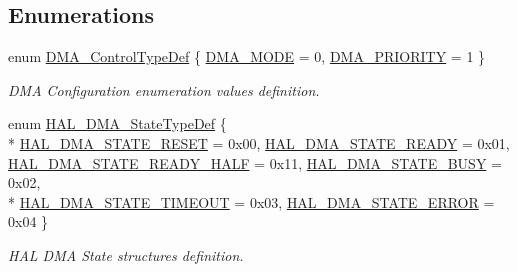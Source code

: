 \subsection*{Enumerations}
\begin{DoxyCompactItemize}
\item 
enum \hyperlink{group___d_m_a___exported___types_ga0d2b4c627fbe74a3100d0959afeae2f1}{D\-M\-A\-\_\-\-Control\-Type\-Def} \{ \hyperlink{group___d_m_a___exported___types_gga0d2b4c627fbe74a3100d0959afeae2f1a1eca8643c497fdd3e425429e7c6cfa42}{D\-M\-A\-\_\-\-M\-O\-D\-E} = 0, 
\hyperlink{group___d_m_a___exported___types_gga0d2b4c627fbe74a3100d0959afeae2f1aeedf19ee552db82049c94b70c8d59fb2}{D\-M\-A\-\_\-\-P\-R\-I\-O\-R\-I\-T\-Y} = 1
 \}
\begin{DoxyCompactList}\small\item\em D\-M\-A Configuration enumeration values definition. \end{DoxyCompactList}\item 
enum \hyperlink{group___d_m_a___exported___types_ga9c012af359987a240826f29073bbe463}{H\-A\-L\-\_\-\-D\-M\-A\-\_\-\-State\-Type\-Def} \{ \\*
\hyperlink{group___d_m_a___exported___types_gga9c012af359987a240826f29073bbe463a9e7be73da32b8c837cde0318e0d5eed2}{H\-A\-L\-\_\-\-D\-M\-A\-\_\-\-S\-T\-A\-T\-E\-\_\-\-R\-E\-S\-E\-T} = 0x00, 
\hyperlink{group___d_m_a___exported___types_gga9c012af359987a240826f29073bbe463ad497944e6e72bc3ca904694b1098105a}{H\-A\-L\-\_\-\-D\-M\-A\-\_\-\-S\-T\-A\-T\-E\-\_\-\-R\-E\-A\-D\-Y} = 0x01, 
\hyperlink{group___d_m_a___exported___types_gga9c012af359987a240826f29073bbe463a2b9016ad80f6a5a497d6ba8af3599f09}{H\-A\-L\-\_\-\-D\-M\-A\-\_\-\-S\-T\-A\-T\-E\-\_\-\-R\-E\-A\-D\-Y\-\_\-\-H\-A\-L\-F} = 0x11, 
\hyperlink{group___d_m_a___exported___types_gga9c012af359987a240826f29073bbe463af7a0a2ca8de4e5be9e85b6a9073476ef}{H\-A\-L\-\_\-\-D\-M\-A\-\_\-\-S\-T\-A\-T\-E\-\_\-\-B\-U\-S\-Y} = 0x02, 
\\*
\hyperlink{group___d_m_a___exported___types_gga9c012af359987a240826f29073bbe463acf3a5443bf4dc71018512a255e2076eb}{H\-A\-L\-\_\-\-D\-M\-A\-\_\-\-S\-T\-A\-T\-E\-\_\-\-T\-I\-M\-E\-O\-U\-T} = 0x03, 
\hyperlink{group___d_m_a___exported___types_gga9c012af359987a240826f29073bbe463ac2ce65c7cb2410c143b14e309ba83742}{H\-A\-L\-\_\-\-D\-M\-A\-\_\-\-S\-T\-A\-T\-E\-\_\-\-E\-R\-R\-O\-R} = 0x04
 \}
\begin{DoxyCompactList}\small\item\em H\-A\-L D\-M\-A State structures definition. \end{DoxyCompactList}\item 

\end{DoxyCompactItemize}
